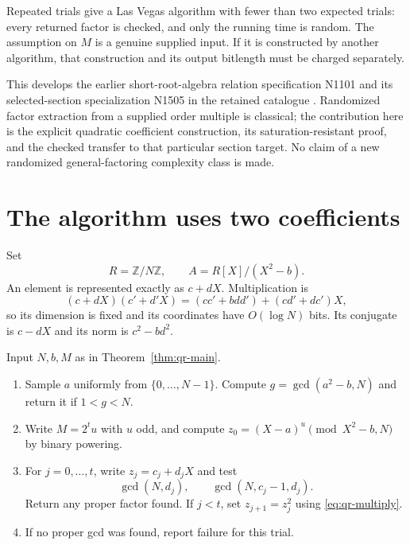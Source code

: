 Repeated trials give a Las Vegas algorithm with fewer than two expected
trials: every returned factor is checked, and only the running time is
random.  The assumption on $M$ is a genuine supplied input.  If it is
constructed by another algorithm, that construction and its output
bitlength must be charged separately.

This develops the earlier short-root-algebra relation specification
N1101 and its selected-section specialization N1505 in the retained
catalogue \cite{BroxCatalogue2026}.  Randomized factor extraction from a
supplied order multiple is classical; the contribution here is the
explicit quadratic coefficient construction, its saturation-resistant
proof, and the checked transfer to that particular section target.
No claim of a new randomized general-factoring complexity class is made.

\section{The algorithm uses two coefficients}
\label{sec:qr-algorithm}

Set
\[
 R=\mathbb Z/N\mathbb Z,
 \qquad A=R[X]/(X^2-b).
\]
An element is represented exactly as $c+dX$.  Multiplication is
\begin{equation}
 (c+dX)(c'+d'X)=(cc'+bdd')+(cd'+dc')X,
 \label{eq:qr-multiply}
\end{equation}
so its dimension is fixed and its coordinates have $O(\log N)$ bits.
Its conjugate is $c-dX$ and its norm is $c^2-bd^2$.

\begin{algorithm}
\label{alg:qr-chain}
Input $N,b,M$ as in Theorem~\ref{thm:qr-main}.
\begin{enumerate}
\item Sample $a$ uniformly from $\{0,\ldots,N-1\}$.
      Compute $g=\gcd(a^2-b,N)$ and return it if $1<g<N$.
\item Write $M=2^tu$ with $u$ odd, and compute
      $z_0=(X-a)^u\pmod{X^2-b,N}$ by binary powering.
\item For $j=0,\ldots,t$, write $z_j=c_j+d_jX$ and test
      \[
       \gcd(N,d_j),\qquad \gcd(N,c_j-1,d_j).
      \]
      Return any proper factor found.  If $j<t$, set
      $z_{j+1}=z_j^2$ using \eqref{eq:qr-multiply}.
\item If no proper gcd was found, report failure for this trial.
\end{enumerate}
\end{algorithm}

